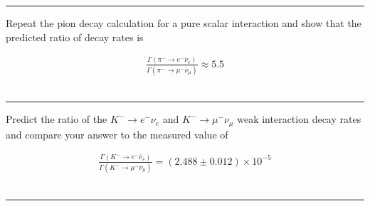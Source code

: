 \noindent\rule{7in}{1.5pt}


\begin{problem}{11.6}
Repeat the pion decay calculation for a pure scalar interaction and show that the predicted ratio of decay rates is

\begin{align*}
    \frac{\Gamma\left( \pi^- \to e^- \overbar{\nu}_e \right)}{\Gamma\left( \pi^- \to \mu^- \overbar{\nu}_\mu \right)} \approx 5.5 
\end{align*}\\
\end{problem}
\begin{solution}

\end{solution}

\noindent\rule{7in}{1.5pt}


\begin{problem}{11.7}
Predict the ratio of the $K^- \to e^- \nu_e$ and $K^- \to \mu^- \nu_\mu$ weak interaction decay rates and compare your answer to the measured value of

\begin{align*}
    \frac{\Gamma\left( K^- \to e^- \overbar{\nu}_e \right)}{\Gamma\left( K^- \to \mu^- \overbar{\nu}_\mu \right)} =   \left( 2.488\pm0.012 \right)\times 10^{-5}  
\end{align*}\\
\end{problem}
\begin{solution}

\end{solution}

\noindent\rule{7in}{1.5pt}


